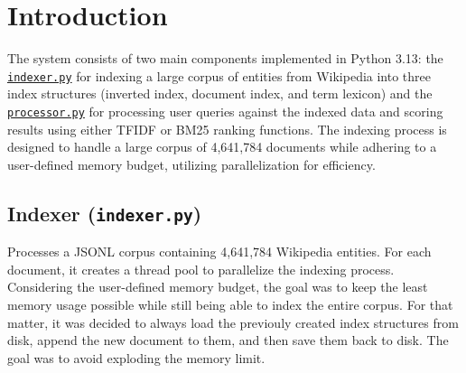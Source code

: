 

\section{Introduction}

The system consists of two main components implemented in Python 3.13: the \hyperref[subsec:indexer]{\texttt{indexer.py}} for indexing a large corpus of entities from Wikipedia into three index structures (inverted index, document index, and term lexicon) and the \hyperref[subsec:processor]{\texttt{processor.py}} for processing user queries against the indexed data and scoring results using either TFIDF or BM25 ranking functions. The indexing process is designed to handle a large corpus of 4,641,784 documents while adhering to a user-defined memory budget, utilizing parallelization for efficiency.

\subsection{Indexer (\texttt{indexer.py})} \label{subsec:indexer}

Processes a JSONL corpus containing 4,641,784 Wikipedia entities. For each document, it creates a thread pool to parallelize the indexing process. Considering the user-defined memory budget, the goal was to keep the least memory usage possible while still being able to index the entire corpus. For that matter, it was decided to always load the previouly created index structures from disk, append the new document to them, and then save them back to disk. The goal was to avoid exploding the memory limit.

